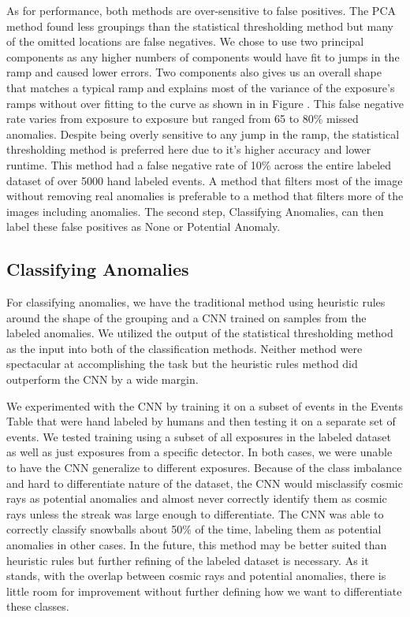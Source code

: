 As for performance, both methods are over-sensitive to false positives.
The PCA method found less groupings than the statistical thresholding method but many of the omitted locations are false negatives.
We chose to use two principal components as any higher numbers of components would have fit to jumps in the ramp and caused lower errors.
Two components also gives us an overall shape that matches a typical ramp and explains most of the variance of the exposure's ramps without over fitting to the curve as shown in in Figure \label{chap5/fig:elbow}.
This false negative rate varies from exposure to exposure but ranged from 65 to 80\% missed anomalies. 
Despite being overly sensitive to any jump in the ramp, the statistical thresholding method is preferred here due to it's higher accuracy and lower runtime.
This method had a false negative rate of 10\% across the entire labeled dataset of over 5000 hand labeled events. 
A method that filters most of the image without removing real anomalies is preferable to a method that filters more of the images including anomalies. The second step, Classifying Anomalies, can then label these false positives as None or Potential Anomaly. 
\subsection{Classifying Anomalies}
For classifying anomalies, we have the traditional method using heuristic rules around the shape of the grouping and a CNN trained on samples from the labeled anomalies. 
We utilized the output of the statistical thresholding method as the input into both of the classification methods. 
Neither method were spectacular at accomplishing the task but the heuristic rules method did outperform the CNN by a wide margin. 

We experimented with the CNN by training it on a subset of events in the Events Table that were hand labeled by humans and then testing it on a separate set of events. 
We tested training using a subset of all exposures in the labeled dataset as well as just exposures from a specific detector.
In both cases, we were unable to have the CNN generalize to different exposures. 
Because of the class imbalance and hard to differentiate nature of the dataset, the CNN would misclassify cosmic rays as potential anomalies and almost never correctly identify them as cosmic rays unless the streak was large enough to differentiate. 
The CNN was able to correctly classify snowballs about 50\% of the time, labeling them as potential anomalies in other cases. 
In the future, this method may be better suited than heuristic rules but further refining of the labeled dataset is necessary. 
As it stands, with the overlap between cosmic rays and potential anomalies, there is little room for improvement without further defining how we want to differentiate these classes. 

